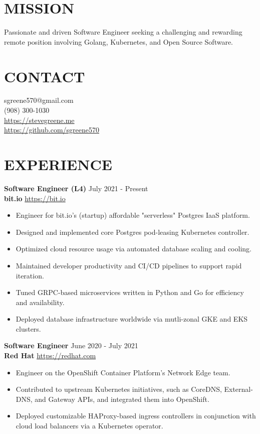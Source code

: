 \documentclass[line, margin, 10.5pt]{res}
\begin{document}

\begin{resume}

\section{\small MISSION}
Passionate and driven Software Engineer seeking a challenging and rewarding remote position involving Golang, Kubernetes, and Open Source Software.

\section{\small CONTACT}
sgreene570@gmail.com \\
(908) 300-1030 \\
\url{https://stevegreene.me} \\
\url{https://github.com/sgreene570}

\section{\small EXPERIENCE}
{\bf \large{Software Engineer (L4)}} \hfill July 2021 - Present \\
{\bf bit.io} \hfill \url{https://bit.io}
\begin{itemize}
    \item Engineer for bit.io's (startup) affordable "serverless" Postgres IaaS platform.
    \item Designed and implemented core Postgres pod-leasing Kubernetes controller.
    \item Optimized cloud resource usage via automated database scaling and cooling.
    \item Maintained developer productivity and CI/CD pipelines to support rapid iteration.
    \item Tuned GRPC-based microservices written in Python and Go for efficiency and availability.
    \item Deployed database infrastructure worldwide via mutli-zonal GKE and EKS clusters.
\end{itemize}

{\bf \large{Software Engineer}} \hfill June 2020 - July 2021 \\
{\bf Red Hat} \hfill \url{https://redhat.com}
\begin{itemize}
    \item Engineer on the OpenShift Container Platform's Network Edge team.
    \item Contributed to upstream Kubernetes initiatives, such as CoreDNS, External-DNS, and Gateway APIs, and integrated them into OpenShift.
    \item Deployed customizable HAProxy-based ingress controllers in conjunction with cloud load balancers via a Kubernetes operator.
\end{itemize}


\end{resume}
\end{document}

